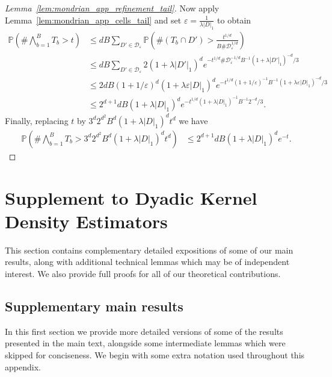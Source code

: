 \documentclass[11pt,lof]{puthesis}
\renewcommand{\P}{\ensuremath{\mathbb{P}}}
\newcommand{\cD}{\ensuremath{\mathcal{D}}}
\theoremstyle{break}
\theoremstyle{proof}
\newtheorem{proof}{Proof}
\begin{document}
\begin{proof}[Lemma~\ref{lem:mondrian_app_refinement_tail}]
%
Now apply Lemma~\ref{lem:mondrian_app_cells_tail}
and set $\varepsilon = \frac{1}{\lambda |D|_1}$ to obtain
%
\begin{align*}
\P\left(
\# \bigwedge_{b=1}^B T_b
> t
\right)
&\leq
d B \sum_{D' \in \cD_\varepsilon}
\P\left(
\# (T_b \cap D')
> \frac{t^{1/d}}{B \# \cD_\varepsilon^{1/d}}
\right) \\
&\leq
d B \sum_{D' \in \cD_\varepsilon}
2 (1 + \lambda |D'|_1)^d
e^{- t^{1/d} \# \cD_\varepsilon^{-1/d} B^{-1}
(1 + \lambda |D'|_1)^{-d} / 3} \\
&\leq
2 d B (1 + 1 / \varepsilon)^d
(1 + \lambda \varepsilon |D|_1)^d
e^{- t^{1/d} (1 + 1/\varepsilon)^{-1} B^{-1}
(1 + \lambda \varepsilon |D|_1)^{-d} / 3} \\
&\leq
2^{d+1} d B (1 + \lambda |D|_1)^d
e^{- t^{1/d} (1 + \lambda |D|_1)^{-1} B^{-1} 2^{-d} / 3}.
\end{align*}
%
Finally, replacing $t$ by $3^d 2^{d^2} B^d (1+\lambda|D|_1)^d t^d$ we have
%
\begin{align*}
\P\left(
\# \bigwedge_{b=1}^B T_b
> 3^d 2^{d^2} B^d (1+\lambda|D|_1)^d t^d
\right)
&\leq
2^{d+1} d B (1 + \lambda |D|_1)^d e^{-t}.
\end{align*}
%
\end{proof}

\chapter{Supplement to Dyadic Kernel Density Estimators}
\label{app:kernel}

This section contains complementary detailed expositions of some
of our main results, along with additional technical lemmas
which may be of independent interest. We also provide full proofs
for all of our theoretical contributions.

\section{Supplementary main results}

In this first section we provide more detailed versions of some of the
results presented in the main text, alongside some intermediate
lemmas which were skipped for conciseness.
We begin with some extra notation used throughout this appendix.
\end{document}
